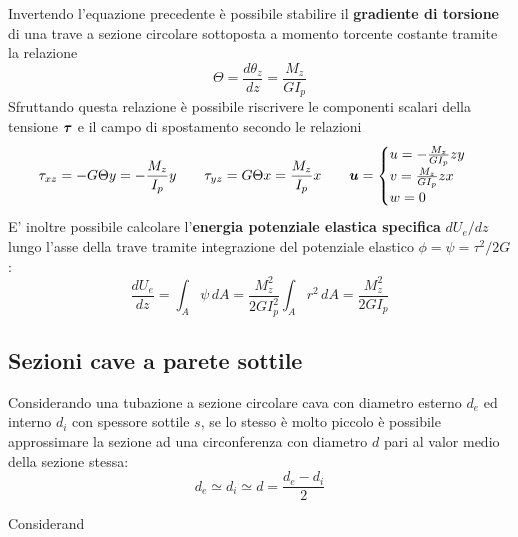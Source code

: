     	\begin{concetto}
    		Invertendo l'equazione precedente è possibile stabilire il \textbf{gradiente di torsione} di una trave a sezione circolare sottoposta a momento torcente costante tramite la relazione
    		\begin{equation}
    			\Theta = \frac{d\theta_z}{dz}= \frac{M_z}{G I_p}
    		\end{equation}
    		Sfruttando questa relazione è possibile riscrivere le componenti scalari della tensione $\boldsymbol{\tau}$ e il campo di spostamento secondo le relazioni
    		\begin{equation}
    			\tau_{xz} = -G\Theta y = - \frac{M_z}{I_p}y \qquad \tau_{yz} = G\Theta x = \frac{M_z}{I_p}x \qquad
    			\boldsymbol{u} = \begin{cases}
    				u =- \frac{M_z}{GI_p} z y \\ v =\frac{M_z}{GI_p} z x \\ w =0
    			\end{cases}
    		\end{equation}
    		E' inoltre possibile calcolare l'\textbf{energia potenziale elastica specifica} $dU_e /dz$ lungo l'asse della trave tramite integrazione del potenziale elastico $\phi = \psi = \tau^2/2G$:
    		\begin{equation}
    			\frac{dU_e}{dz} = \int_A\psi \, dA = \frac{M_z^2}{2GI_p^2} \int_Ar^2\, dA  = \frac{M_z^2}{2GI_p}
    		\end{equation}
    	\end{concetto}
    	
    \subsection{Sezioni cave a parete sottile}
    	Considerando una tubazione a sezione circolare cava con diametro esterno $d_e$ ed interno $d_i$ con spessore sottile $s$, se lo stesso è molto piccolo è possibile approssimare la sezione ad una circonferenza con diametro $d$ pari al valor medio della sezione stessa:
    	\[ d_e \simeq d_i \simeq d = \frac{d_e - d_i}{2}\]
    	
    	Considerand
    	
    	
    	
    	
    	
    	
    	
    	
    	
    	
    	
    	
    	
    	
    	
    	
    	
    	
    	
    	
    	
    	
    	
    	
    	
    	
    